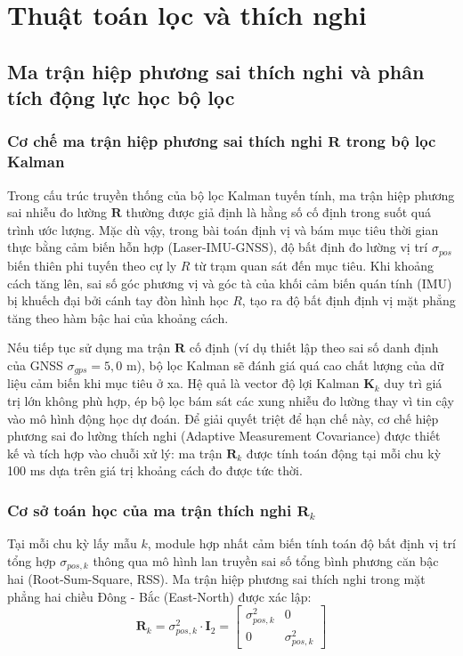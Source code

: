 \section{Thuật toán lọc và thích nghi}

\subsection{Ma trận hiệp phương sai thích nghi và phân tích động lực học bộ lọc}

\subsubsection{Cơ chế ma trận hiệp phương sai thích nghi \texorpdfstring{$\mathbf{R}$}{R} trong bộ lọc Kalman}

\hspace{0.5cm} Trong cấu trúc truyền thống của bộ lọc Kalman tuyến tính, ma trận hiệp phương sai nhiễu đo lường $\mathbf{R}$ thường được giả định là hằng số cố định trong suốt quá trình ước lượng. Mặc dù vậy, trong bài toán định vị và bám mục tiêu thời gian thực bằng cảm biến hỗn hợp (Laser-IMU-GNSS), độ bất định đo lường vị trí $\sigma_{pos}$ biến thiên phi tuyến theo cự ly $R$ từ trạm quan sát đến mục tiêu. Khi khoảng cách tăng lên, sai số góc phương vị và góc tà của khối cảm biến quán tính (IMU) bị khuếch đại bởi cánh tay đòn hình học $R$, tạo ra độ bất định định vị mặt phẳng tăng theo hàm bậc hai của khoảng cách.

Nếu tiếp tục sử dụng ma trận $\mathbf{R}$ cố định (ví dụ thiết lập theo sai số danh định của GNSS $\sigma_{gps} = 5{,}0$ m), bộ lọc Kalman sẽ đánh giá quá cao chất lượng của dữ liệu cảm biến khi mục tiêu ở xa. Hệ quả là vector độ lợi Kalman $\mathbf{K}_k$ duy trì giá trị lớn không phù hợp, ép bộ lọc bám sát các xung nhiễu đo lường thay vì tin cậy vào mô hình động học dự đoán. Để giải quyết triệt để hạn chế này, cơ chế hiệp phương sai đo lường thích nghi (Adaptive Measurement Covariance) được thiết kế và tích hợp vào chuỗi xử lý: ma trận $\mathbf{R}_k$ được tính toán động tại mỗi chu kỳ 100 ms dựa trên giá trị khoảng cách đo được tức thời.

\subsubsection{Cơ sở toán học của ma trận thích nghi \texorpdfstring{$\mathbf{R}_k$}{Rk}}

\hspace{0.5cm} Tại mỗi chu kỳ lấy mẫu $k$, module hợp nhất cảm biến tính toán độ bất định vị trí tổng hợp $\sigma_{pos,k}$ thông qua mô hình lan truyền sai số tổng bình phương căn bậc hai (Root-Sum-Square, RSS). Ma trận hiệp phương sai thích nghi trong mặt phẳng hai chiều Đông - Bắc (East-North) được xác lập:
\begin{equation}
\mathbf{R}_k = \sigma_{pos,k}^2 \cdot \mathbf{I}_2 = \begin{bmatrix} \sigma_{pos,k}^2 & 0 \\ 0 & \sigma_{pos,k}^2 \end{bmatrix}
\label{eq:adaptive-r-definition}
\end{equation}

